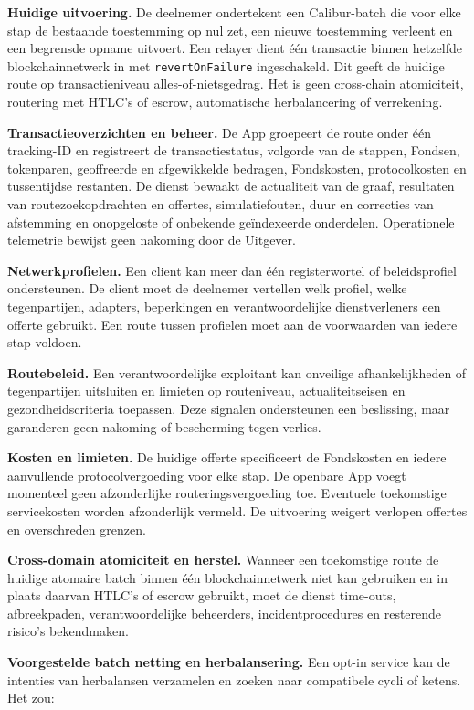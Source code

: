 \documentclass[11pt]{article}
\begin{document}
\textbf{Huidige uitvoering.} De deelnemer ondertekent een Calibur-batch die voor elke stap de bestaande toestemming op nul zet, een nieuwe toestemming verleent en een begrensde opname uitvoert. Een relayer dient één transactie binnen hetzelfde blockchainnetwerk in met \texttt{revertOnFailure} ingeschakeld. Dit geeft de huidige route op transactieniveau alles-of-nietsgedrag. Het is geen cross-chain atomiciteit, routering met HTLC's of escrow, automatische herbalancering of verrekening.

\textbf{Transactieoverzichten en beheer.} De App groepeert de route onder één tracking-ID en registreert de transactiestatus, volgorde van de stappen, Fondsen, tokenparen, geoffreerde en afgewikkelde bedragen, Fondskosten, protocolkosten en tussentijdse restanten. De dienst bewaakt de actualiteit van de graaf, resultaten van routezoekopdrachten en offertes, simulatiefouten, duur en correcties van afstemming en onopgeloste of onbekende geïndexeerde onderdelen. Operationele telemetrie bewijst geen nakoming door de Uitgever.

\textbf{Netwerkprofielen.} Een client kan meer dan één registerwortel of beleidsprofiel ondersteunen. De client moet de deelnemer vertellen welk profiel, welke tegenpartijen, adapters, beperkingen en verantwoordelijke dienstverleners een offerte gebruikt. Een route tussen profielen moet aan de voorwaarden van iedere stap voldoen.

\textbf{Routebeleid.} Een verantwoordelijke exploitant kan onveilige afhankelijkheden of tegenpartijen uitsluiten en limieten op routeniveau, actualiteitseisen en gezondheidscriteria toepassen. Deze signalen ondersteunen een beslissing, maar garanderen geen nakoming of bescherming tegen verlies.

\textbf{Kosten en limieten.} De huidige offerte specificeert de Fondskosten en iedere aanvullende protocolvergoeding voor elke stap. De openbare App voegt momenteel geen afzonderlijke routeringsvergoeding toe. Eventuele toekomstige servicekosten worden afzonderlijk vermeld. De uitvoering weigert verlopen offertes en overschreden grenzen.

\textbf{Cross-domain atomiciteit en herstel.} Wanneer een toekomstige route de huidige atomaire batch binnen één blockchainnetwerk niet kan gebruiken en in plaats daarvan HTLC's of escrow gebruikt, moet de dienst time-outs, afbreekpaden, verantwoordelijke beheerders, incidentprocedures en resterende risico's bekendmaken.

\textbf{Voorgestelde batch netting en herbalansering.} Een opt-in service kan de intenties van herbalansen verzamelen en zoeken naar compatibele cycli of ketens. Het zou:
\end{document}
